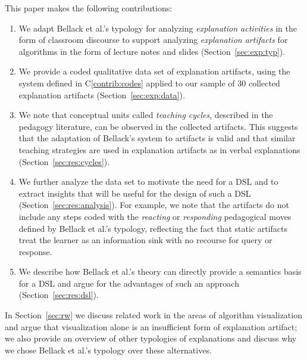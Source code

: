 \documentclass[conference]{IEEEtran}
\begin{document}
This paper makes the following contributions:
%
\begin{enumerate}[C1.]

\item \label{contrib:codes}
%
We adapt Bellack et al.'s typology for analyzing \emph{explanation activities}
in the form of classroom discourse to support analyzing \emph{explanation
artifacts} for algorithms in the form of lecture notes and slides
(Section~\ref{sec:exp:typ}).

\item \label{contrib:data}
%
We provide a coded qualitative data set of explanation artifacts, using the
system defined in C\ref{contrib:codes} applied to our sample of 30 collected
explanation artifacts (Section~\ref{sec:exp:data}).

\item \label{contrib:valid}
%
We note that conceptual units called \emph{teaching cycles}, described in the
pedagogy literature, can be observed in the collected artifacts. This suggests
that the adaptation of Bellack's system to artifacts is valid and that similar
teaching strategies are used in explanation artifacts as in verbal explanations
(Section~\ref{sec:res:cycles}).

\item \label{contrib:analysis}
%
We further analyze the data set to motivate the need for a DSL and to extract
insights that will be useful for the design of such a DSL
(Section~\ref{sec:res:analysis}). For example, we note that the artifacts do
not include any steps coded with the \emph{reacting} or \emph{responding}
pedagogical moves defined by Bellack et al.'s typology, reflecting the fact
that static artifacts treat the learner as an information sink with no recourse
for query or response.

\item \label{contrib:dsl}
%
We describe how Bellack et al.'s theory can directly provide a semantics basis
for a DSL and argue for the advantages of such an approach (Section~\ref{sec:res:dsl}).
%
\end{enumerate}

\noindent
%
In Section~\ref{sec:rw} we discuss related work in the areas of algorithm
visualization and argue that visualization alone is an insufficient form of
explanation artifact; we also provide an overview of other typologies of
explanations and discuss why we chose Bellack et al.'s typology over these
alternatives.
\end{document}
